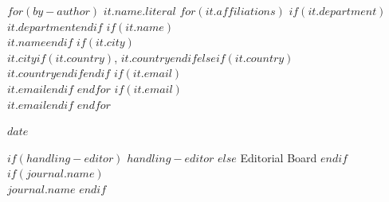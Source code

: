 \begin{flushright}
$for(by-author)$
$it.name.literal$
$for(it.affiliations)$
$if(it.department)$\\ $it.department$$endif$
$if(it.name)$\\ $it.name$$endif$
$if(it.city)$\\ $it.city$$if(it.country)$, $it.country$$endif$$else$$if(it.country)$\\ $it.country$$endif$$endif$
$if(it.email)$\\ $it.email$$endif$
$endfor$
$if(it.email)$\\ $it.email$$endif$
$endfor$

\vspace{1.5em}
$date$
\end{flushright}

\vspace{2.5em}

\begin{flushleft}
$if(handling-editor)$
$handling-editor$
$else$
Editorial Board
$endif$
$if(journal.name)$
\\ \textit{$journal.name$}
$endif$
\end{flushleft}

\vspace{2em}